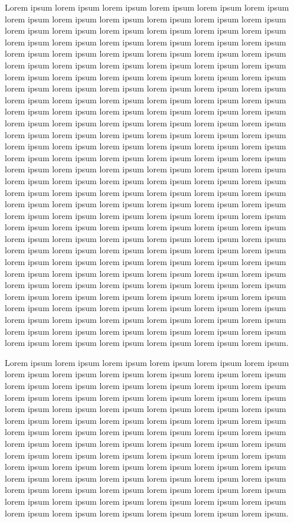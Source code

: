 \documentclass[10pt,twocolumn]{article}
\begin{document}
Lorem ipsum lorem ipsum lorem ipsum lorem ipsum lorem ipsum lorem ipsum lorem
ipsum lorem ipsum lorem ipsum lorem ipsum lorem ipsum lorem ipsum lorem ipsum
lorem ipsum lorem ipsum lorem ipsum lorem ipsum lorem ipsum lorem ipsum lorem
ipsum lorem ipsum lorem ipsum lorem ipsum lorem ipsum lorem ipsum lorem ipsum
lorem ipsum lorem ipsum lorem ipsum lorem ipsum lorem ipsum lorem ipsum lorem
ipsum lorem ipsum lorem ipsum lorem ipsum lorem ipsum lorem ipsum lorem ipsum
lorem ipsum lorem ipsum lorem ipsum lorem ipsum lorem ipsum lorem ipsum lorem
ipsum lorem ipsum lorem ipsum lorem ipsum lorem ipsum lorem ipsum lorem ipsum
lorem ipsum lorem ipsum lorem ipsum lorem ipsum lorem ipsum lorem ipsum lorem
ipsum lorem ipsum lorem ipsum lorem ipsum lorem ipsum lorem ipsum lorem ipsum
lorem ipsum lorem ipsum lorem ipsum lorem ipsum lorem ipsum lorem ipsum lorem
ipsum lorem ipsum lorem ipsum lorem ipsum lorem ipsum lorem ipsum lorem ipsum
lorem ipsum lorem ipsum lorem ipsum lorem ipsum lorem ipsum lorem ipsum lorem
ipsum lorem ipsum lorem ipsum lorem ipsum lorem ipsum lorem ipsum lorem ipsum
lorem ipsum lorem ipsum lorem ipsum lorem ipsum lorem ipsum lorem ipsum lorem
ipsum lorem ipsum lorem ipsum lorem ipsum lorem ipsum lorem ipsum lorem ipsum
lorem ipsum lorem ipsum lorem ipsum lorem ipsum lorem ipsum lorem ipsum lorem
ipsum lorem ipsum lorem ipsum lorem ipsum lorem ipsum lorem ipsum lorem ipsum
lorem ipsum lorem ipsum lorem ipsum lorem ipsum lorem ipsum lorem ipsum lorem
ipsum lorem ipsum lorem ipsum lorem ipsum lorem ipsum lorem ipsum lorem ipsum
lorem ipsum lorem ipsum lorem ipsum lorem ipsum lorem ipsum lorem ipsum lorem
ipsum lorem ipsum lorem ipsum lorem ipsum lorem ipsum lorem ipsum lorem ipsum
lorem ipsum lorem ipsum lorem ipsum lorem ipsum lorem ipsum lorem ipsum lorem
ipsum lorem ipsum lorem ipsum lorem ipsum lorem ipsum lorem ipsum lorem ipsum
lorem ipsum lorem ipsum lorem ipsum lorem ipsum lorem ipsum lorem ipsum lorem
ipsum lorem ipsum lorem ipsum lorem ipsum lorem ipsum lorem ipsum lorem ipsum
lorem ipsum lorem ipsum lorem ipsum lorem ipsum lorem ipsum lorem ipsum lorem
ipsum lorem ipsum lorem ipsum lorem ipsum lorem ipsum.

Lorem ipsum lorem ipsum lorem ipsum lorem ipsum lorem ipsum lorem ipsum lorem
ipsum lorem ipsum lorem ipsum lorem ipsum lorem ipsum lorem ipsum lorem ipsum
lorem ipsum lorem ipsum lorem ipsum lorem ipsum lorem ipsum lorem ipsum lorem
ipsum lorem ipsum lorem ipsum lorem ipsum lorem ipsum lorem ipsum lorem ipsum
lorem ipsum lorem ipsum lorem ipsum lorem ipsum lorem ipsum lorem ipsum lorem
ipsum lorem ipsum lorem ipsum lorem ipsum lorem ipsum lorem ipsum lorem ipsum
lorem ipsum lorem ipsum lorem ipsum lorem ipsum lorem ipsum lorem ipsum lorem
ipsum lorem ipsum lorem ipsum lorem ipsum lorem ipsum lorem ipsum lorem ipsum
lorem ipsum lorem ipsum lorem ipsum lorem ipsum lorem ipsum lorem ipsum lorem
ipsum lorem ipsum lorem ipsum lorem ipsum lorem ipsum lorem ipsum lorem ipsum
lorem ipsum lorem ipsum lorem ipsum lorem ipsum lorem ipsum lorem ipsum lorem
ipsum lorem ipsum lorem ipsum lorem ipsum lorem ipsum lorem ipsum lorem ipsum
lorem ipsum lorem ipsum lorem ipsum lorem ipsum lorem ipsum lorem ipsum.
\end{document}
